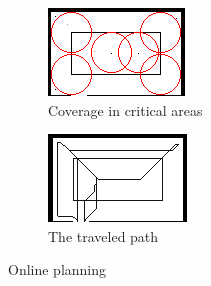 \begin{figure}[ht]
  \begin{subfigure}[t]{0.3\textwidth}
    \includegraphics[width = \textwidth]{graphics/sq/coverage}
    \caption{Coverage in critical areas}
    \label{sqcoverage}
  \end{subfigure}
  \begin{subfigure}[t]{0.3\textwidth}
    \includegraphics[width = \textwidth]{graphics/sq/path}
    \caption{The traveled path}
    \label{sqpath}
  \end{subfigure}
  \caption{Online planning}
  \label{online_planning}
\end{figure}
